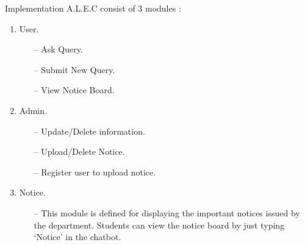 \documentclass{beamer}
\begin{document}
\begin{frame}{Implementation}
A.L.E.C consist of 3 modules :
\linebreak
    \begin{enumerate}
        \item User.
          \begin{itemize}
              \item[--] Ask Query.
              \item[--] Submit New Query.
              \item[--] View Notice Board.
          \end{itemize}
        \item Admin.
           \begin{itemize}
               \item[--] Update/Delete information.
               \item[--] Upload/Delete Notice.   
               \item[--] Register user to upload notice.
           \end{itemize}
        \item Notice.
          \begin{itemize}
              \item[--] This module is defined for displaying the important notices issued by the department. Students can view the notice board by just typing ‘Notice’ in the chatbot. 
          \end{itemize}
    \end{enumerate}
        
\end{frame}
\end{document}
